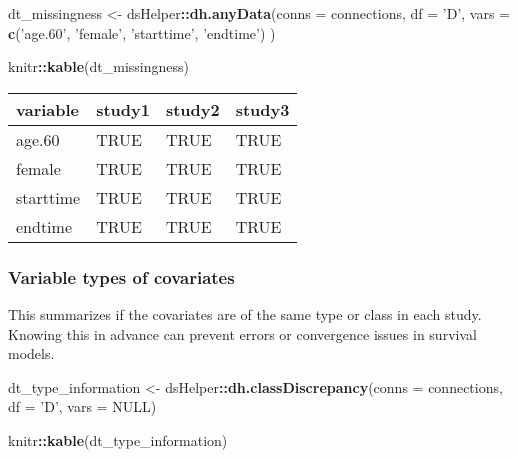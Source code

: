 \documentclass[
]{article}
\newenvironment{Shaded}{\begin{snugshade}}{\end{snugshade}}
\newcommand{\DataTypeTok}[1]{\textcolor[rgb]{0.13,0.29,0.53}{#1}}
\newcommand{\KeywordTok}[1]{\textcolor[rgb]{0.13,0.29,0.53}{\textbf{#1}}}
\newcommand{\NormalTok}[1]{#1}
\newcommand{\OperatorTok}[1]{\textcolor[rgb]{0.81,0.36,0.00}{\textbf{#1}}}
\newcommand{\OtherTok}[1]{\textcolor[rgb]{0.56,0.35,0.01}{#1}}
\newcommand{\StringTok}[1]{\textcolor[rgb]{0.31,0.60,0.02}{#1}}
\begin{document}
\begin{Shaded}
\begin{Highlighting}[]
\NormalTok{    dt_missingness <-}\StringTok{ }\NormalTok{dsHelper}\OperatorTok{::}\KeywordTok{dh.anyData}\NormalTok{(}\DataTypeTok{conns =}\NormalTok{ connections,  }
                                           \DataTypeTok{df =} \StringTok{'D'}\NormalTok{, }
                       \DataTypeTok{vars =} \KeywordTok{c}\NormalTok{(}\StringTok{'age.60'}\NormalTok{, }\StringTok{'female'}\NormalTok{, }\StringTok{'starttime'}\NormalTok{, }\StringTok{'endtime'}\NormalTok{)}
\NormalTok{                       ) }

\NormalTok{    knitr}\OperatorTok{::}\KeywordTok{kable}\NormalTok{(dt_missingness)}
\end{Highlighting}
\end{Shaded}

\begin{longtable}[]{@{}llll@{}}
\toprule
variable & study1 & study2 & study3\tabularnewline
\midrule
\endhead
age.60 & TRUE & TRUE & TRUE\tabularnewline
female & TRUE & TRUE & TRUE\tabularnewline
starttime & TRUE & TRUE & TRUE\tabularnewline
endtime & TRUE & TRUE & TRUE\tabularnewline
\bottomrule
\end{longtable}

\hypertarget{variable-types-of-covariates}{%
\subsubsection{Variable types of
covariates}\label{variable-types-of-covariates}}

This summarizes if the covariates are of the same type or class in each
study. Knowing this in advance can prevent errors or convergence issues
in survival models.

\begin{Shaded}
\begin{Highlighting}[]
\NormalTok{  dt_type_information <-}\StringTok{ }\NormalTok{dsHelper}\OperatorTok{::}\KeywordTok{dh.classDiscrepancy}\NormalTok{(}\DataTypeTok{conns =}\NormalTok{ connections, }
                                                       \DataTypeTok{df =} \StringTok{'D'}\NormalTok{,}
                               \DataTypeTok{vars =} \OtherTok{NULL}\NormalTok{)}

\NormalTok{  knitr}\OperatorTok{::}\KeywordTok{kable}\NormalTok{(dt_type_information)}
\end{Highlighting}
\end{Shaded}
\end{document}
